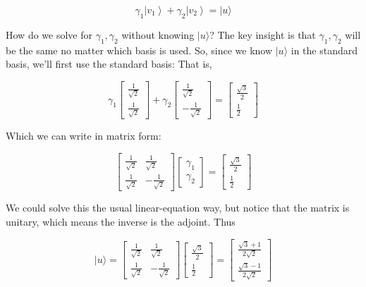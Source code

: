 \documentclass[main.tex]{subfiles}
\begin{document}
    $$
    \gamma_{1}\left|v_{1}\right\rangle+\gamma_{2}\left|v_{2}\right\rangle=|u\rangle
    $$
    
    How do we solve for $\gamma_{1}, \gamma_{2}$ without knowing $|u\rangle$? The key insight is that $\gamma_{1}, \gamma_{2}$ will be the same no matter which basis is used. So, since we know $|u\rangle$ in the standard basis, we'll first use the standard basis: That is,
    
    $$
    \gamma_{1}\left[\begin{array}{c}
    \frac{1}{\sqrt{2}} \\
    \frac{1}{\sqrt{2}}
    \end{array}\right]+\gamma_{2}\left[\begin{array}{r}
    \frac{1}{\sqrt{2}} \\
    -\frac{1}{\sqrt{2}}
    \end{array}\right]=\left[\begin{array}{c}
    \frac{\sqrt{3}}{2} \\
    \frac{1}{2}
    \end{array}\right]
    $$
    
    Which we can write in matrix form:
    
    $$
    \left[\begin{array}{cc}
    \frac{1}{\sqrt{2}} & \frac{1}{\sqrt{2}} \\
    \frac{1}{\sqrt{2}} & -\frac{1}{\sqrt{2}}
    \end{array}\right]\left[\begin{array}{l}
    \gamma_{1} \\
    \gamma_{2}
    \end{array}\right]=\left[\begin{array}{c}
    \frac{\sqrt{3}}{2} \\
    \frac{1}{2}
    \end{array}\right]
    $$
    
    We could solve this the usual linear-equation way, but notice that the matrix is unitary, which means the inverse is the adjoint. Thus
    
    $$
    |u\rangle=\left[\begin{array}{cc}
    \frac{1}{\sqrt{2}} & \frac{1}{\sqrt{2}} \\
    \frac{1}{\sqrt{2}} & -\frac{1}{\sqrt{2}}
    \end{array}\right]\left[\begin{array}{c}
    \frac{\sqrt{3}}{2} \\
    \frac{1}{2}
    \end{array}\right]=\left[\begin{array}{c}
    \frac{\sqrt{3}+1}{2 \sqrt{2}} \\
    \frac{\sqrt{3}-1}{2 \sqrt{2}}
    \end{array}\right]
    $$
    
\end{document}
